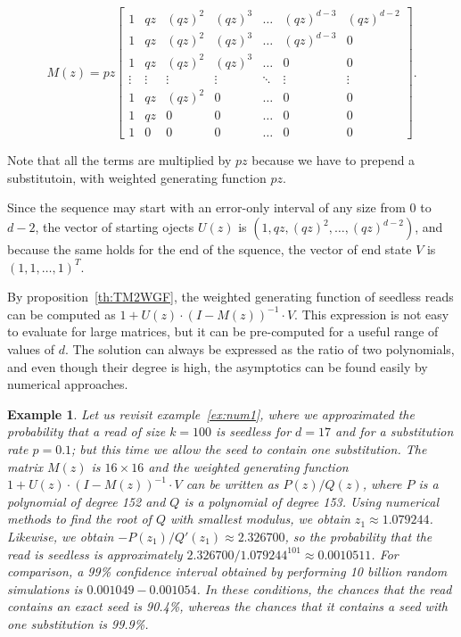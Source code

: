 \documentclass{article}
\newtheorem{example}{Example}
\begin{document}
\begin{equation}
M(z) = pz\left[
\begin{matrix}
1 & qz  & (qz)^2 & (qz)^3 & \ldots & (qz)^{d-3} & (qz)^{d-2} \\
1 & qz  & (qz)^2 & (qz)^3 & \ldots & (qz)^{d-3} & 0          \\
1 & qz  & (qz)^2 & (qz)^3 & \ldots & 0          & 0          \\
\vdots & \vdots & \vdots & \vdots & \ddots & \vdots & \vdots \\
1 & qz  & (qz)^2 & 0      & \ldots & 0          & 0          \\
1 & qz  & 0      & 0      & \ldots & 0          & 0          \\
1 & 0   & 0      & 0      & \ldots & 0          & 0
\end{matrix}
\right].
\end{equation}

Note that all the terms are multiplied by $pz$ because we have to prepend
a substitutoin, with weighted generating function $pz$.

Since the sequence may start with an error-only interval of any size from
$0$ to $d-2$, the vector of starting ojects $U(z)$ is $(1, qz, (qz)^2,
\ldots, (qz)^{d-2})$, and because the same holds for the end of the
squence, the vector of end state $V$ is $(1,1, \ldots, 1)^T$.

By proposition~\ref{th:TM2WGF}, the weighted generating function of
seedless reads can be computed as $1+U(z) \cdot (I-M(z))^{-1} \cdot V$.
This expression is not easy to evaluate for large matrices, but it can be
pre-computed for a useful range of values of $d$. The solution can always
be expressed as the ratio of two polynomials, and even though their degree
is high, the asymptotics can be found easily by numerical approaches.

\begin{example}
Let us revisit example~\ref{ex:num1}, where we approximated the
probability that a read of size $k=100$ is seedless for $d=17$ and for a
substitution rate $p=0.1$; but this time we allow the seed to contain one
substitution.  The matrix $M(z)$ is $16\times16$ and the weighted
generating function $1+U(z)\cdot(I-M(z))^{-1}\cdot V$ can be written as
$P(z)/Q(z)$, where $P$ is a polynomial of degree 152 and $Q$ is a
polynomial of degree 153.  Using numerical methods to find the root of $Q$
with smallest modulus, we obtain $z_1 \approx 1.079244$. Likewise,
we obtain $-P(z_1)/Q'(z_1) \approx 2.326700$, so the probability
that the read is seedless is approximately
$2.326700/1.079244^{101} \approx 0.0010511$.
For comparison, a 99\% confidence interval obtained by performing 10
billion random simulations is $0.001049-0.001054$.
In these conditions, the chances that the read contains an exact seed is
90.4\%, whereas the chances that it contains a seed with one substitution
is 99.9\%.
\end{example}
\end{document}
